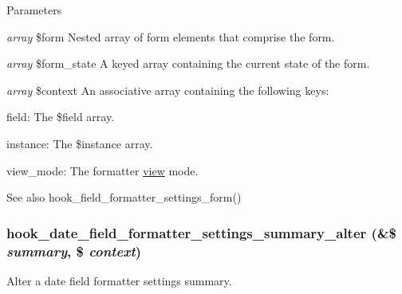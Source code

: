 \begin{DoxyParams}{Parameters}
\item[{\em array}]\$form Nested array of form elements that comprise the form. \item[{\em array}]\$form\_\-state A keyed array containing the current state of the form. \item[{\em array}]\$context An associative array containing the following keys:
\begin{DoxyItemize}
\item field: The \$field array.
\item instance: The \$instance array.
\item view\_\-mode: The formatter \hyperlink{classview}{view} mode.
\end{DoxyItemize}\end{DoxyParams}
\begin{DoxySeeAlso}{See also}
hook\_\-field\_\-formatter\_\-settings\_\-form() 
\end{DoxySeeAlso}
\hypertarget{date_8api_8php_a8448df9f491a337e9da8ec9157934107}{
\subsubsection[{hook\_\-date\_\-field\_\-formatter\_\-settings\_\-summary\_\-alter}]{\setlength{\rightskip}{0pt plus 5cm}hook\_\-date\_\-field\_\-formatter\_\-settings\_\-summary\_\-alter (\&\$ {\em summary}, \/  \$ {\em context})}}
\label{date_8api_8php_a8448df9f491a337e9da8ec9157934107}
Alter a date field formatter settings summary.


